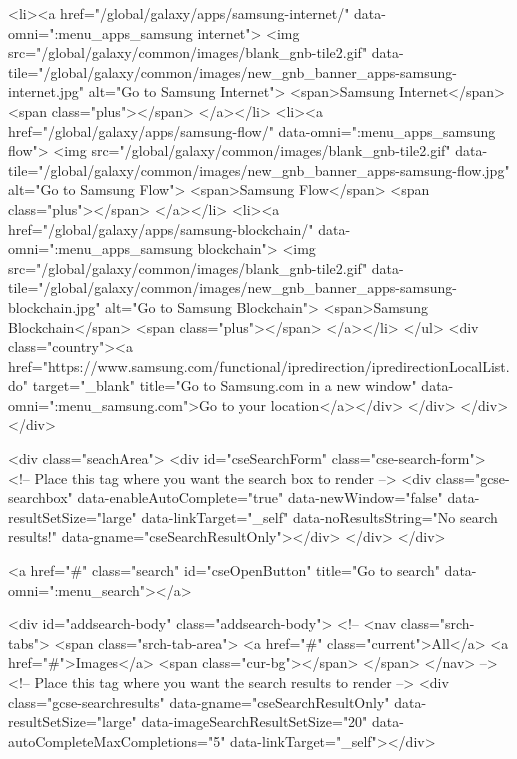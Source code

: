 							<li><a href="/global/galaxy/apps/samsung-internet/" data-omni=":menu_apps_samsung internet">
									<img src="/global/galaxy/common/images/blank_gnb-tile2.gif"
											data-tile="/global/galaxy/common/images/new_gnb_banner_apps-samsung-internet.jpg"
											alt="Go to Samsung Internet">
									<span>Samsung Internet</span>
									<span class="plus"></span>
							</a></li>
							<li><a href="/global/galaxy/apps/samsung-flow/" data-omni=":menu_apps_samsung flow">
									<img src="/global/galaxy/common/images/blank_gnb-tile2.gif"
											data-tile="/global/galaxy/common/images/new_gnb_banner_apps-samsung-flow.jpg"
											alt="Go to Samsung Flow">
									<span>Samsung Flow</span>
									<span class="plus"></span>
							</a></li>
							<li><a href="/global/galaxy/apps/samsung-blockchain/" data-omni=":menu_apps_samsung blockchain">
									<img src="/global/galaxy/common/images/blank_gnb-tile2.gif"
											data-tile="/global/galaxy/common/images/new_gnb_banner_apps-samsung-blockchain.jpg"
											alt="Go to Samsung Blockchain">
									<span>Samsung Blockchain</span>
									<span class="plus"></span>
							</a></li>
						</ul>
						<div class="country"><a href="https://www.samsung.com/functional/ipredirection/ipredirectionLocalList.do" target="_blank" title="Go to Samsung.com in a new window" data-omni=":menu_samsung.com">Go to your location</a></div>
					</div>
				</div>
			</div>

			<div class="seachArea">
				<div id="cseSearchForm" class="cse-search-form">
					<!-- Place this tag where you want the search box to render -->
					<div class="gcse-searchbox"
						data-enableAutoComplete="true"
						data-newWindow="false"
						data-resultSetSize="large"
						data-linkTarget="_self"
						data-noResultsString="No search results!"
						data-gname="cseSearchResultOnly"></div>
				</div>
			</div>

			<a href="#" class="search" id="cseOpenButton" title="Go to search" data-omni=":menu_search"></a>

			<div id="addsearch-body" class="addsearch-body">
				<!-- <nav class="srch-tabs">
					<span class="srch-tab-area">
						<a href="#" class="current">All</a>
						<a href="#">Images</a>
						<span class="cur-bg"></span>
					</span>
				</nav> -->
				<!-- Place this tag where you want the search results to render -->
				<div class="gcse-searchresults"
					data-gname="cseSearchResultOnly"
					data-resultSetSize="large"
					data-imageSearchResultSetSize="20"
					data-autoCompleteMaxCompletions="5"
					data-linkTarget="_self"></div>

